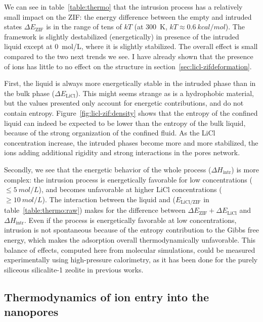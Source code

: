 \documentclass[thesis]{subfiles}
\begin{document}
We can see in table~\ref{table:thermo} that the intrusion process has a
relatively small impact on the ZIF: the energy difference between the empty and
intruded states $\Delta E_\text{ZIF}$ is in the range of tens of $kT$ (at \SI{300}{K},
$kT \approx \SI{0.6}{kcal/mol}$). The  framework is slightly destabilized
(energetically) in presence of the intruded liquid except at \SI{0}{mol/L},
where it is slightly stabilized. The overall effect is small compared to the two
next trends we see. I have already shown that the presence of ions has little
to no effect on the  structure in section~\ref{sec:licl-zifdeformation}.

First, the liquid is always more energetically stable in the intruded phase than
in the bulk phase ($\Delta E_\text{LiCl}$). This might seems strange as  is
a hydrophobic material, but the values presented only account for energetic
contributions, and do not contain entropy. Figure~\ref{fig:licl-zif:density}
shows that the entropy of the confined liquid can indeed be expected to be lower
than the entropy of the bulk liquid, because of the strong organization of the
confined fluid. As the LiCl concentration increase, the intruded phases become
more and more stabilized, the ions adding additional rigidity and strong
interactions in the pores network.

Secondly, we see that the energetic behavior of the whole process ($\Delta
H_\text{intr}$) is more complex: the intrusion process is energetically
favorable for low concentrations ($\leq \SI{5}{mol/L}$), and becomes unfavorable
at higher LiCl concentrations ($\geq \SI{10}{mol/L}$). The interaction between
the liquid and  ($E_\text{LiCl/ZIF}$ in table~\ref{table:thermo:raw}) makes
for the difference between $\Delta E_\text{ZIF} + \Delta E_\text{LiCl}$ and
$\Delta H_\text{intr}$. Even if the process is energetically favorable at low
concentrations, intrusion is not spontaneous because of the entropy contribution
to the Gibbs free energy, which makes the adsorption overall thermodynamically
unfavorable. This balance of effects, computed here from molecular simulations,
could be measured experimentally using high-pressure calorimetry, as it has been
done for the purely siliceous silicalite-1 zeolite\cite{Karbowiak2009,
Karbowiak2010} in previous works.

\subsection{Thermodynamics of ion entry into the nanopores}
\end{document}
